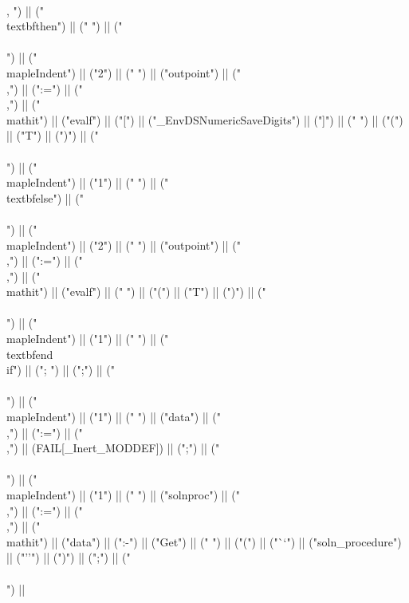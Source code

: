 \documentclass{article}
\begin{document}
\begin{center}
\begin{maplelatex}
{\\, ") || ("\\textbf{then}") || (" ") || ("\\\\\n") || ("\\mapleIndent{") || ("2") || ("} ") || ("outpoint") || ("\\,") || (":=") || ("\\,") || ("\\mathit{") || ("evalf") || ("[") || ("_EnvDSNumericSaveDigits") || ("]") || ("} ") || ("(") || ("T") || (")") || ("\\\\\n") || ("\\mapleIndent{") || ("1") || ("} ") || ("\\textbf{else}") || ("\\\\\n") || ("\\mapleIndent{") || ("2") || ("} ") || ("outpoint") || ("\\,") || (":=") || ("\\,") || ("\\mathit{") || ("evalf") || ("} ") || ("(") || ("T") || (")") || ("\\\\\n") || ("\\mapleIndent{") || ("1") || ("} ") || ("\\textbf{end\\ if}") || ("; ") || (";") || ("\\\\\n") || ("\\mapleIndent{") || ("1") || ("} ") || ("data") || ("\\,") || (":=") || ("\\,") || (FAIL[_Inert_MODDEF]) || (";") || ("\\\\\n") || ("\\mapleIndent{") || ("1") || ("} ") || ("solnproc") || ("\\,") || (":=") || ("\\,") || ("\\mathit{") || ("data") || (":-") || ("Get") || ("} ") || ("(") || ("``") || ("soln_procedure") || ("''") || (")") || (";") || ("\\\\\n") || }
\end{maplelatex}
\end{center}
\end{document}
